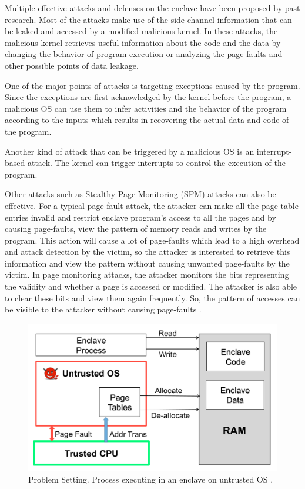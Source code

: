 Multiple effective attacks and defenses on the enclave have been proposed by past research. Most of the attacks make use of the side-channel information that can be leaked and accessed by a modified malicious kernel. In these attacks, the malicious kernel retrieves useful information about the code and the data by changing the behavior of program execution or analyzing the page-faults and other possible points of data leakage.

One of the major points of attacks is targeting exceptions caused by the program. Since the exceptions are first acknowledged by the kernel before the program, a malicious OS can use them to infer activities and the behavior of the program according to the inputs which results in recovering the actual data and code of the program.

Another kind of attack that can be triggered by a malicious OS is an interrupt-based attack. The kernel can trigger interrupts to control the execution of the program.

Other attacks such as Stealthy Page Monitoring (SPM) attacks \cite{stealthy,leakycauldron} can also be effective. For a typical page-fault attack, the attacker can make all the page table entries invalid and restrict enclave program’s access to all the pages and by causing page-faults, view the pattern of memory reads and writes by the program. This action will cause a lot of page-faults which lead to a high overhead and attack detection by the victim, so the attacker is interested to retrieve this information and view the pattern without causing unwanted page-faults by the victim. In page monitoring attacks, the attacker monitors the bits representing the validity and whether a page is accessed or modified. The attacker is also able to clear these bits and view them again frequently. So, the pattern of accesses can be visible to the attacker without causing page-faults \cite{stealthy,leakycauldron}.


\begin{figure}
	\includegraphics[scale=0.2]{images/uos1}
	\caption{Problem Setting. Process executing in an enclave on untrusted OS \cite{pigeonhole}.}
	\label{fig:uos}
\end{figure}

